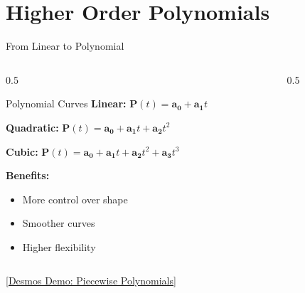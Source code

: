 \section{Higher Order Polynomials}

\begin{frame}{From Linear to Polynomial}
  \begin{columns}
    \begin{column}{0.5\textwidth}
      \begin{mathbox}{Polynomial Curves}
        \small
        \textbf{Linear:} $\mathbf{P}(t) = \mathbf{a_0} + \mathbf{a_1}t$

        \textbf{Quadratic:} $\mathbf{P}(t) = \mathbf{a_0} + \mathbf{a_1}t + \mathbf{a_2}t^2$

        \textbf{Cubic:} $\mathbf{P}(t) = \mathbf{a_0} + \mathbf{a_1}t + \mathbf{a_2}t^2 + \mathbf{a_3}t^3$

        \vspace{0.3cm}
        \textbf{Benefits:}
        \begin{itemize}
            \scriptsize
          \item More control over shape
          \item Smoother curves
          \item Higher flexibility
        \end{itemize}
      \end{mathbox}
    \end{column}
    \begin{column}{0.5\textwidth}
      \begin{center}
      \end{center}
    \end{column}
  \end{columns}

  \vspace{0.5cm}

  \begin{center}
    \textcolor{AccentColor}{\href{https://www.desmos.com/calculator/bibrrrs4lv}{[Desmos Demo: Piecewise Polynomials]}}
  \end{center}
\end{frame}

